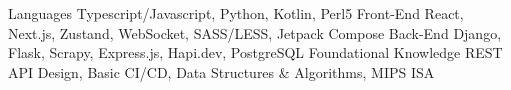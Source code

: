 
\begin{cvskills}
  \cvskill
    {Languages} %
    {Typescript/Javascript, Python, Kotlin, Perl5} %
  \cvskill
    {Front-End}
    {React, Next.js, Zustand, WebSocket, SASS/LESS, Jetpack Compose}
  \cvskill
    {Back-End} %
    {Django, Flask, Scrapy, Express.js, Hapi.dev, PostgreSQL} %
  \cvskill
    {Foundational Knowledge}
    {REST API Design, Basic CI/CD, Data Structures \& Algorithms, MIPS ISA}
\end{cvskills}
